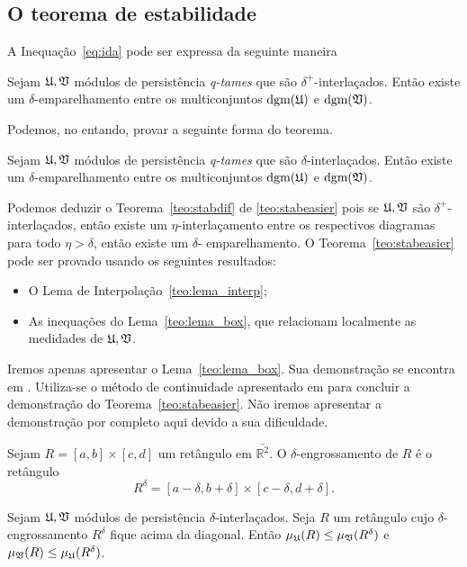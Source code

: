 \subsection{O teorema de estabilidade}
A Inequação~\ref{eq:ida} pode ser expressa da seguinte maneira
\begin{teo}\label{teo:stabdif}
    Sejam $\mathfrak{U}, \mathfrak{V}$ módulos de persistência \textit{q-tames} que são 
    $\delta^+$-interlaçados. Então existe um $\delta$-emparelhamento entre os 
    multiconjuntos $\text{dgm}(\mathfrak{U})$ e $\text{dgm}(\mathfrak{V})$. 
\end{teo}

Podemos, no entando, provar a seguinte forma do teorema.
\begin{teo}\label{teo:stabeasier}
    Sejam $\mathfrak{U}, \mathfrak{V}$ módulos de persistência \textit{q-tames} que são 
    $\delta$-interlaçados. Então existe um $\delta$-emparelhamento entre os 
    multiconjuntos $\text{dgm}(\mathfrak{U})$ e $\text{dgm}(\mathfrak{V})$. 
\end{teo}

Podemos deduzir o Teorema~\ref{teo:stabdif} de \ref{teo:stabeasier} pois se 
$\mathfrak{U}, \mathfrak{V}$ são $\delta^+$-interlaçados, então existe um $\eta$-interlaçamento
entre os respectivos diagramas para todo $\eta > \delta$, então existe um $\delta$-
emparelhamento. O Teorema~\ref{teo:stabeasier} pode ser provado usando os seguintes
resultados:
\begin{itemize}
    \item O Lema de Interpolação~\ref{teo:lema_interp};
    \item As inequações do Lema~\ref{teo:lema_box}, que relacionam localmente
    as medidades de $\mathfrak{U}, \mathfrak{V}$. 
\end{itemize}
Iremos apenas apresentar o Lema~\ref{teo:lema_box}. Sua demonstração se 
encontra em \cite{Chazal2016}. Utiliza-se o método de continuidade apresentado
em \cite{CohenSteiner2006} para concluir a demonstração do Teorema~\ref{teo:stabeasier}.
Não iremos apresentar a demonstração por completo aqui devido a sua dificuldade. 

\begin{defi}
    Sejam $R = [a,b] \times [c,d]$ um retângulo em $\bar{\mathbb{R}^2}$. O 
    $\delta$-engrossamento de $R$ é o retângulo
    \begin{equation*}
        R^\delta = [a-\delta, b+\delta] \times [c-\delta, d + \delta].
    \end{equation*}
\end{defi}

\begin{lem}\label{teo:lema_box}
    Sejam $\mathfrak{U}, \mathfrak{V}$ módulos de persistência $\delta$-interlaçados. Seja 
    $R$ um retângulo cujo $\delta$-engrossamento $R^\delta$ fique acima da diagonal.
    Então $\mu_{\mathfrak{U}}(R) \leq \mu_{\mathfrak{V}}(R^\delta)$ e $\mu_{\mathfrak{V}}(R) \leq \mu_{\mathfrak{U}}(R^\delta)$.
\end{lem}
